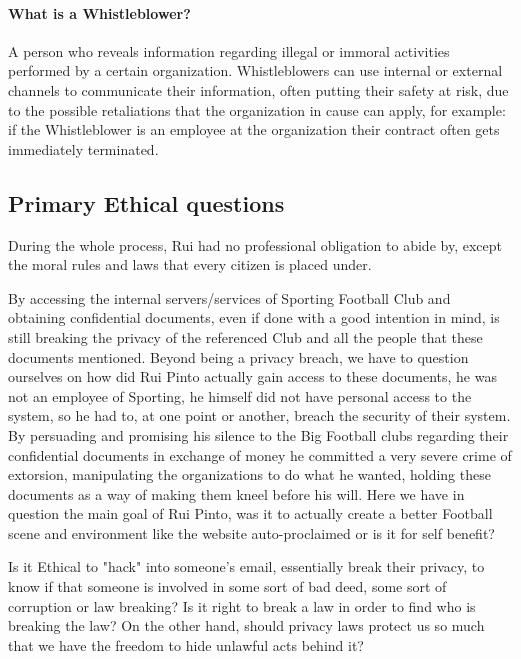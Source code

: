 \paragraph{What is a Whistleblower?} A person who reveals information regarding illegal or immoral activities performed by a certain organization.
Whistleblowers can use internal or external channels to communicate their information, often putting their safety at risk, due to the possible retaliations that the organization in cause can apply, for example: if the Whistleblower is an employee at the organization their contract often gets immediately terminated.



\subsection{Primary Ethical questions}
During the whole process, Rui had no professional obligation to abide by, except the moral rules and laws that every citizen is placed under.

By accessing the internal servers/services of Sporting Football Club and obtaining confidential documents, even if done with a good intention in mind, is still breaking the privacy of the referenced Club and all the people that these documents mentioned.
Beyond being a privacy breach, we have to question ourselves on how did Rui Pinto actually gain access to these documents, he was not an employee of Sporting, he himself did not have personal access to the system, so he had to, at one point or another, breach the security  of their system.
By persuading and promising his silence to the Big Football clubs regarding their confidential documents in exchange of money he committed a very severe crime of extorsion, manipulating the organizations to do what he wanted, holding these documents as a way of making them kneel before his will.
Here we have in question the main goal of Rui Pinto, was it to actually create a better Football scene and environment like the website auto-proclaimed or is it for self benefit?

Is it Ethical to "hack" into someone's email, essentially break their privacy, to know if that someone is involved in some sort of bad deed, some sort of corruption or law breaking?
Is it right to break a law in order to find who is breaking the law?
On the other hand, should privacy laws protect us so much that we have the freedom to hide unlawful acts behind it?


